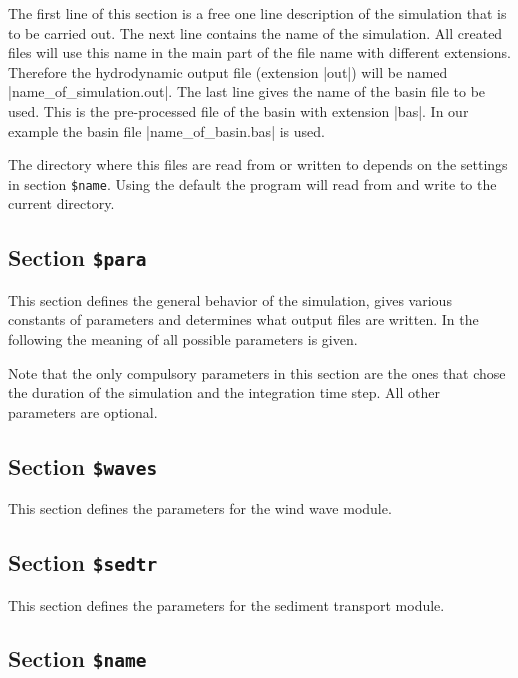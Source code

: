 \documentclass{report}
\begin{document}
The first line of this section is a free one line description of
the simulation that is to be carried out. The next line contains
the name of the simulation.
All created files will use this name in the main part of the file name
with different extensions. Therefore the hydrodynamic output file
(extension |out|) will be named |name_of_simulation.out|.
The last line gives the name of the basin file to be used. This
is the pre-processed file of the basin with extension |bas|.
In our example the basin file |name_of_basin.bas| is used.

The directory where this files are read from or written to depends
on the settings in section {\tt \$name}. Using the default
the program will read from and write to the current directory.

\subsection{Section {\tt \$para}}

This section defines the general behavior of the simulation,
gives various constants of parameters and determines what
output files are written. In the following the meaning of
all possible parameters is given.

Note that the only compulsory parameters in this section are 
the ones that chose the duration of the simulation and the
integration time step. All other parameters are optional.



\subsection{Section {\tt \$waves}}

This section defines the parameters for the wind wave module.



\subsection{Section {\tt \$sedtr}}

This section defines the parameters for the sediment 
transport module.



\subsection{Section {\tt \$name}}
\end{document}
